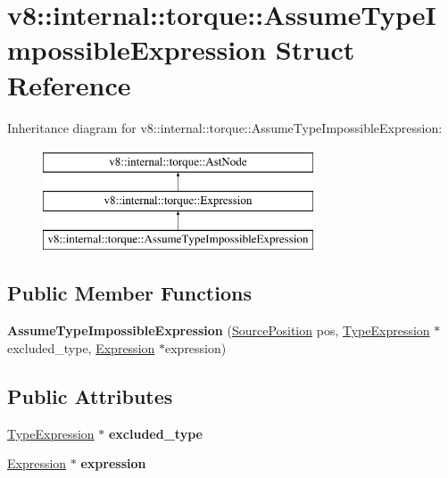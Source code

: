\hypertarget{structv8_1_1internal_1_1torque_1_1AssumeTypeImpossibleExpression}{}\section{v8\+:\+:internal\+:\+:torque\+:\+:Assume\+Type\+Impossible\+Expression Struct Reference}
\label{structv8_1_1internal_1_1torque_1_1AssumeTypeImpossibleExpression}
Inheritance diagram for v8\+:\+:internal\+:\+:torque\+:\+:Assume\+Type\+Impossible\+Expression\+:\begin{figure}[H]
\begin{center}
\leavevmode
\includegraphics[height=3.000000cm]{structv8_1_1internal_1_1torque_1_1AssumeTypeImpossibleExpression}
\end{center}
\end{figure}
\subsection*{Public Member Functions}
\begin{DoxyCompactItemize}
\item 
\mbox{\label{structv8_1_1internal_1_1torque_1_1AssumeTypeImpossibleExpression_ae63f5773bba645e2b60b939e49357aae}} 
{\bfseries Assume\+Type\+Impossible\+Expression} (\mbox{\hyperlink{structv8_1_1internal_1_1torque_1_1SourcePosition}{Source\+Position}} pos, \mbox{\hyperlink{structv8_1_1internal_1_1torque_1_1TypeExpression}{Type\+Expression}} $\ast$excluded\+\_\+type, \mbox{\hyperlink{structv8_1_1internal_1_1torque_1_1Expression}{Expression}} $\ast$expression)
\end{DoxyCompactItemize}
\subsection*{Public Attributes}
\begin{DoxyCompactItemize}
\item 
\mbox{\label{structv8_1_1internal_1_1torque_1_1AssumeTypeImpossibleExpression_a545b3becca8cb28246f9468868932dfc}} 
\mbox{\hyperlink{structv8_1_1internal_1_1torque_1_1TypeExpression}{Type\+Expression}} $\ast$ {\bfseries excluded\+\_\+type}
\item 
\mbox{\label{structv8_1_1internal_1_1torque_1_1AssumeTypeImpossibleExpression_a96903c7704cc3e660c8c76d92113faf2}} 
\mbox{\hyperlink{structv8_1_1internal_1_1torque_1_1Expression}{Expression}} $\ast$ {\bfseries expression}
\end{DoxyCompactItemize}
